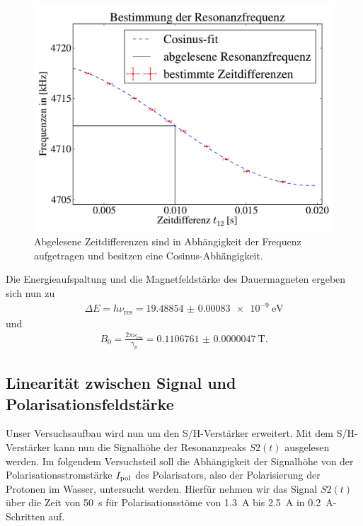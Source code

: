 \documentclass[paper=a4,
	fontsize=10pt,
	DIV=18,
	twocolumn,
	parskip=half
	]{scrartcl}
\numberwithin{equation}{section}    %
\begin{document}
\begin{figure}[htp]
	\begin{center}
		\includegraphics[width=\columnwidth]{Data-Plots/02-Resonanzfrequenz.pdf}
		\caption{Abgelesene Zeitdifferenzen sind in Abhängigkeit der Frequenz aufgetragen und besitzen eine Cosinus-Abhängigkeit.}
		\label{resonanzfrequenz}
	\end{center}
\end{figure}
Die Energieaufspaltung und die Magnetfeldstärke des Dauermagneten ergeben sich nun zu
\begin{align}
	\Delta E =h\nu_{\mathrm{res}}=\SI[separate-uncertainty=false]{19.48854(83) e-9}{\electronvolt}
\end{align}
und
\begin{align}
	B_0=\frac{2 \pi \nu_{\mathrm{res}}}{\gamma_p}=\SI[separate-uncertainty=false]{0.1106761(47)}{\tesla}.
\end{align}



\subsection{Linearität zwischen Signal und Polarisationsfeldstärke}
\label{auswertung4}

Unser Versuchsaufbau wird nun um den S/H-Verstärker erweitert. Mit dem S/H-Verstärker kann nun die Signalhöhe der Resonanzpeaks $S2(t)$ ausgelesen werden. Im folgendem Versuchsteil soll die Abhängigkeit der Signalhöhe von der Polarisationsstromstärke $I_{\rm pol}$ des Polarisators, also der Polarisierung der Protonen im Wasser, untersucht werden. Hierfür nehmen wir das Signal $S2(t)$ über die Zeit von \SI{50}{\second} für Polarisationsstöme von \SI{1.3}{\ampere} bis \SI{2.5}{\ampere} in \SI{0.2}{\ampere}-Schritten auf.
\end{document}
